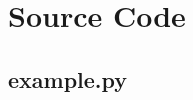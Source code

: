 \section{Source Code}
\label{sec:source-code}

\subsection{example.py}
\inputminted{python}{src/example.py}
